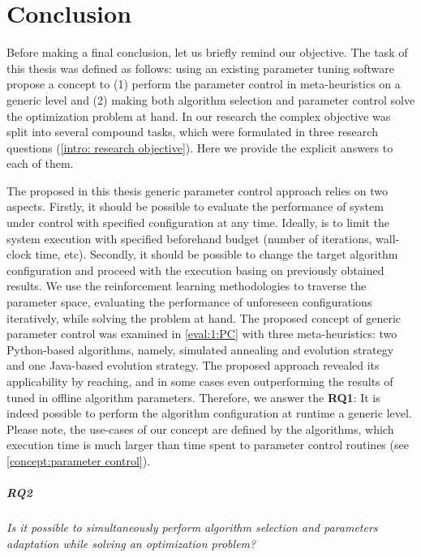\chapter{Conclusion}\label{conclusion}
Before making a final conclusion, let us briefly remind our objective.
The task of this thesis was defined as follows: using an existing parameter tuning software propose a concept to (1) perform the parameter control in meta-heuristics on a generic level and (2) making both algorithm selection and parameter control solve the optimization problem at hand. In our research the complex objective was split into several compound tasks, which were formulated in three research questions (\cref{intro: research objective}). Here we provide the explicit answers to each of them.

The proposed in this thesis generic parameter control approach relies on two aspects. Firstly, it should be possible to evaluate the performance of system under control with specified configuration at any time. Ideally, is to limit the system execution with specified beforehand budget (number of iterations, wall-clock time, etc). Secondly, it should be possible to change the target algorithm configuration and proceed with the execution basing on previously obtained results. We use the reinforcement learning methodologies to traverse the parameter space, evaluating the performance of unforeseen configurations iteratively, while solving the problem at hand. The proposed concept of generic parameter control was examined in \cref{eval:1:PC} with three meta-heuristics: two Python-based algorithms, namely, simulated annealing and evolution strategy and one Java-based evolution strategy. The proposed approach revealed its applicability by reaching, and in some cases even outperforming the results of tuned in offline algorithm parameters. Therefore, we answer the \textbf{RQ1}: It is indeed possible to perform the algorithm configuration at runtime a generic level. Please note, the use-cases of our concept are defined by the algorithms, which execution time is much larger than time spent to parameter control routines (see \cref{concept:parameter control}).

\paragraph{RQ2} \emph{Is it possible to simultaneously perform algorithm selection and parameters adaptation while solving an optimization problem?}


